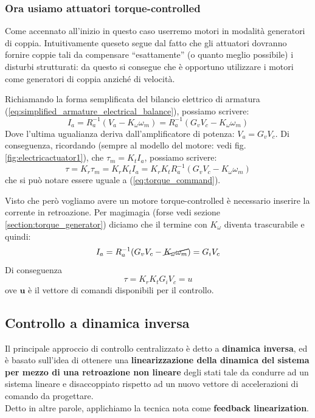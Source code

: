 \subsubsection{Ora usiamo attuatori torque-controlled}
Come accennato all'inizio in questo caso userremo motori in modalità generatori di coppia. Intuitivamente queseto segue dal fatto che gli attuatori dovranno fornire coppie tali da compensare “esattamente” (o quanto meglio possibile) i disturbi strutturati: da questo si consegue che è opportuno utilizzare i motori come generatori di coppia anziché di velocità.

Richiamando la forma semplificata del bilancio elettrico di armatura (\ref{eq:simplified_armature_electrical_balance}), possiamo scrivere:
$$
I_a = R_a^{-1}(V_a - K_\omega \omega_m) = R_a^{-1}(G_vV_c - K_\omega \omega_m)
$$
Dove l'ultima ugualianza deriva dall'amplificatore di potenza: $V_a = G_v V_c$.
Di conseguenza, ricordando (sempre al modello del motore: vedi fig. \ref{fig:electricactuator1}), che $\tau_m = K_t I_a$, possiamo scrivere:
$$
\tau = K_r \tau_m = K_r K_t I_a = K_r K_t R_a^{-1}(G_vV_c - K_\omega \omega_m)
$$
che si può notare essere uguale a (\ref{eq:torque_command}).

Visto che però vogliamo avere un motore torque-controlled è necessario inserire la corrente in retroazione. 
Per magimagia (forse vedi sezione \ref{section:torque_generator}) diciamo che il termine con $K_\omega$ diventa trascurabile e quindi:
$$
I_a = R_a^{-1}(G_vV_c - \cancel{K_\omega\omega_m}) = G_i V_c
$$
Di conseguenza
\boldmath
$$
\tau = K_r K_t G_i V_c = u
$$
\unboldmath
ove $\mathbf{u}$ è il vettore di comandi disponibili per il controllo.







\vspace*{20pt}
\subsection{Controllo a dinamica inversa}\label{section:joint_space_inverse_dyn_contr}

Il principale approccio di controllo centralizzato è detto a \textbf{dinamica inversa}, ed è basato sull’idea di ottenere una \textbf{linearizzazione della dinamica del sistema per mezzo di una retroazione non lineare} degli stati tale da condurre ad un sistema lineare e disaccoppiato rispetto ad un nuovo vettore di accelerazioni di comando da progettare. \\
Detto in altre parole, applichiamo la tecnica nota come \textbf{feedback linearization}.

